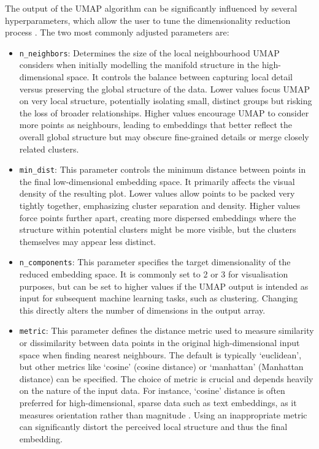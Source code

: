 \documentclass[10pt,oneside]{report}
\begin{document}
The output of the UMAP algorithm can be significantly influenced by several hyperparameters, which allow the user to tune the dimensionality reduction process \cite{mcinnes2018umap}. The two most commonly adjusted parameters are:
\begin{itemize}
    \item \texttt{n\_neighbors}: Determines the size of the local neighbourhood UMAP considers when initially modelling the manifold structure in the high-dimensional space. It controls the balance between capturing local detail versus preserving the global structure of the data. Lower values focus UMAP on very local structure, potentially isolating small, distinct groups but risking the loss of broader relationships. Higher values encourage UMAP to consider more points as neighbours, leading to embeddings that better reflect the overall global structure but may obscure fine-grained details or merge closely related clusters.
    \item \texttt{min\_dist}: This parameter controls the minimum distance between points in the final low-dimensional embedding space. It primarily affects the visual density of the resulting plot. Lower values allow points to be packed very tightly together, emphasizing cluster separation and density. Higher values force points further apart, creating more dispersed embeddings where the structure within potential clusters might be more visible, but the clusters themselves may appear less distinct.
    \item \texttt{n\_components}: This parameter specifies the target dimensionality of the reduced embedding space. It is commonly set to 2 or 3 for visualisation purposes, but can be set to higher values if the UMAP output is intended as input for subsequent machine learning tasks, such as clustering. Changing this directly alters the number of dimensions in the output array. 
    \item \texttt{metric}: This parameter defines the distance metric used to measure similarity or dissimilarity between data points in the original high-dimensional input space when finding nearest neighbours. The default is typically `euclidean', but other metrics like `cosine' (cosine distance) or `manhattan' (Manhattan distance) can be specified. The choice of metric is crucial and depends heavily on the nature of the input data. For instance, `cosine' distance is often preferred for high-dimensional, sparse data such as text embeddings, as it measures orientation rather than magnitude \cite{mcinnes2018umap}. Using an inappropriate metric can significantly distort the perceived local structure and thus the final embedding.
\end{itemize}
\end{document}
